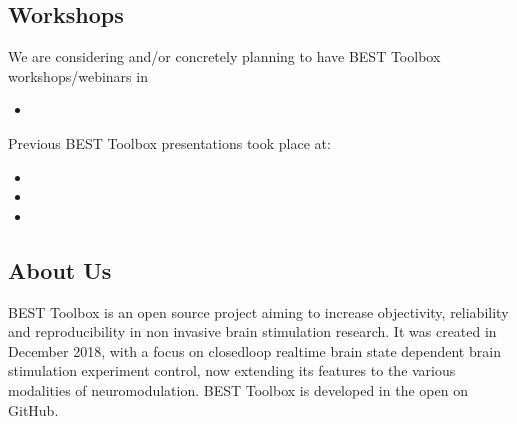 \documentclass[letterpaper,10pt,english]{sphinxmanual}
\begin{document}
\subsection{Workshops}
\label{\detokenize{16_Workshops:workshops}}\label{\detokenize{16_Workshops::doc}}
\sphinxAtStartPar
We are considering and/or concretely planning to have BEST Toolbox workshops/webinars in
\begin{itemize}
\item {} 
\sphinxAtStartPar
{}

\end{itemize}

\sphinxAtStartPar
Previous BEST Toolbox presentations took place at:
\begin{itemize}
\item {} 
\sphinxAtStartPar
{}

\item {} 
\sphinxAtStartPar
{}

\item {} 
\sphinxAtStartPar
{}

\end{itemize}


\subsection{About Us}
\label{\detokenize{17_About Us:about-us}}\label{\detokenize{17_About Us::doc}}
\sphinxAtStartPar
BEST Toolbox is an open source project aiming to increase objectivity, reliability and reproducibility in non invasive brain stimulation research. It was created in December 2018, with a focus on closed\sphinxhyphen{}loop real\sphinxhyphen{}time brain state dependent brain stimulation experiment control, now extending its features to the various modalities of neuromodulation. BEST Toolbox is developed in the open on GitHub.
\end{document}
